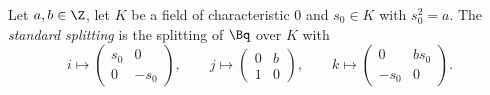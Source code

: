 Let $a,b\in\Z$, let $K$ be a field of characteristic $0$ and $s_0\in K$ with $s_0^2=a$. The \emph{standard splitting} is the
splitting of $\Bq$ over $K$ with
\[
  i\mapsto\begin{pmatrix}s_0&0\\0&-s_0\end{pmatrix},\qquad j\mapsto\begin{pmatrix}0&b\\1&0\end{pmatrix},\qquad
  k\mapsto\begin{pmatrix}0&bs_0\\-s_0&0\end{pmatrix}.
\]

